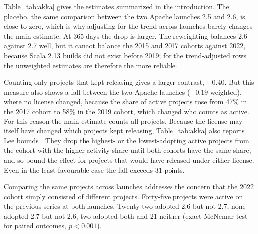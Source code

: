 \documentclass[11pt]{article}
\begin{document}
Table~\ref{tab:akka} gives the estimates summarized in the introduction. The placebo, the same comparison between the two Apache launches 2.5 and 2.6, is close to zero, which is why adjusting for the trend across launches barely changes the main estimate. At 365 days the drop is larger. The reweighting balances 2.6 against 2.7 well, but it cannot balance the 2015 and 2017 cohorts against 2022, because Scala 2.13 builds did not exist before 2019; for the trend-adjusted rows the unweighted estimates are therefore the more reliable.

Counting only projects that kept releasing gives a larger contrast, $-0.40$. But this measure also shows a fall between the two Apache launches ($-0.19$ weighted), where no license changed, because the share of active projects rose from 47\% in the 2017 cohort to 58\% in the 2019 cohort, which changed who counts as active. For this reason the main estimate counts all projects. Because the license may itself have changed which projects kept releasing, Table~\ref{tab:akka} also reports Lee bounds \citep{lee2009}. They drop the highest- or the lowest-adopting active projects from the cohort with the higher activity share until both cohorts have the same share, and so bound the effect for projects that would have released under either license. Even in the least favourable case the fall exceeds 31 points.

Comparing the same projects across launches addresses the concern that the 2022 cohort simply consisted of different projects. Forty-five projects were active on the previous series at both launches. Twenty-two adopted 2.6 but not 2.7, none adopted 2.7 but not 2.6, two adopted both and 21 neither (exact McNemar test for paired outcomes, $p<0.001$).
\end{document}
